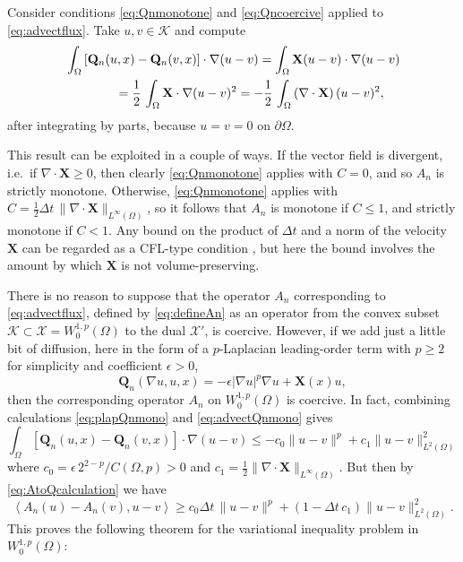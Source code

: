 \documentclass[final,leqno,onefignum,onetabnum]{siamltex1213bueler}
\newcommand\bQ{\mathbf{Q}}
\newcommand\bX{\mathbf{X}}
\newcommand{\Div}{\nabla\cdot}
\newcommand\eps{\epsilon}
\renewcommand{\grad}{\nabla}
\newcommand{\ip}[2]{\ensuremath{\left<#1,#2\right>}}
\begin{document}
Consider conditions \eqref{eq:Qnmonotone} and \eqref{eq:Qncoercive} applied to \eqref{eq:advectflux}.  Take $u,v\in\mathcal{K}$ and compute
\begin{align}
   &\int_\Omega \left[\bQ_n(u,x) - \bQ_n(v,x)\right] \cdot \grad (u - v) = \int_\Omega \bX (u-v) \cdot \grad (u - v)   \label{eq:advectQnmono} \\
   &\qquad\qquad = \frac{1}{2}\,\int_\Omega \bX \cdot \grad (u - v)^2 = - \frac{1}{2}\,\int_\Omega \left(\Div\bX\right) (u - v)^2, \notag
\end{align}
after integrating by parts, because $u=v=0$ on $\partial \Omega$.

This result can be exploited in a couple of ways.  If the vector field is divergent, i.e.~if $\Div\bX\ge 0$, then clearly \eqref{eq:Qnmonotone} applies with $C=0$, and so $A_n$ is strictly monotone.  Otherwise, \eqref{eq:Qnmonotone} applies with $C = \frac{1}{2}\Delta t\,\|\Div\bX\|_{L^\infty(\Omega)}$, so it follows that $A_n$ is monotone if $C\le 1$, and strictly monotone if $C<1$.  Any bound on the product of $\Delta t$ and a norm of the velocity $\bX$ can be regarded as a CFL-type condition \cite{LeVeque2002}, but here the bound involves the amount by which $\bX$ is not volume-preserving.

There is no reason to suppose that the operator $A_n$ corresponding to \eqref{eq:advectflux}, defined by \eqref{eq:defineAn} as an operator from the convex subset $\mathcal{K} \subset \mathcal{X} = W_0^{1,p}(\Omega)$ to the dual $\mathcal{X}'$, is coercive.  However, if we add just a little bit of diffusion, here in the form of a $p$-Laplacian leading-order term with $p\ge 2$ for simplicity and coefficient $\eps>0$,
\begin{equation}
  \bQ_n(\grad u,u,x) = -\eps |\grad u|^p \grad u + \bX(x) u,   \label{eq:plapadvectflux}
\end{equation}
then the corresponding operator $A_n$ on $W_0^{1,p}(\Omega)$ is coercive.  In fact, combining calculations \eqref{eq:plapQnmono} and \eqref{eq:advectQnmono} gives
\begin{equation}
\int_\Omega \left[\bQ_n(u,x) - \bQ_n(v,x)\right] \cdot \grad (u - v) \le - c_0 \|u-v\|^p + c_1 \|u-v\|_{L^2(\Omega)}^2
\end{equation}
where $c_0=\eps\, 2^{2-p}/C(\Omega,p)>0$ and $c_1 = \frac{1}{2}\|\Div\bX\|_{L^\infty(\Omega)}$.  But then by \eqref{eq:AtoQcalculation} we have
\begin{equation}
\ip{A_n(u) - A_n(v)}{u-v} \ge c_0 \Delta t\, \|u-v\|^p + (1-\Delta t\,c_1) \|u-v\|_{L^2(\Omega)}^2.
\end{equation}
This proves the following theorem for the variational inequality problem in $W_0^{1,p}(\Omega)$:
\end{document}
